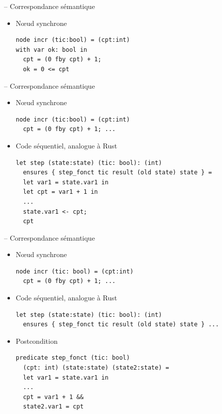\documentclass[11pt,usenames,dvipsnames]{beamer}
\begin{document}
\begin{frame}[fragile]{-- Correspondance sémantique}
\begin{itemize}
\item Nœud synchrone
  \begin{lstlisting}[language=minils]
node incr (tic:bool) = (cpt:int)
with var ok: bool in
  cpt = (0 fby cpt) + 1;
  ok = 0 <= cpt\end{lstlisting}
  \end{itemize}
\end{frame}

\begin{frame}[fragile]{-- Correspondance sémantique}
\begin{itemize}
\item Nœud synchrone
  \begin{lstlisting}[language=minils]
node incr (tic:bool) = (cpt:int)
  cpt = (0 fby cpt) + 1; ...\end{lstlisting}
\item Code séquentiel, analogue à Rust
  \begin{lstlisting}[language=why3]
let step (state:state) (tic: bool): (int)
  ensures { step_fonct tic result (old state) state } =
  let var1 = state.var1 in
  let cpt = var1 + 1 in
  ...
  state.var1 <- cpt;
  cpt
  \end{lstlisting}
\end{itemize}
\end{frame}

\begin{frame}[fragile]{-- Correspondance sémantique}
\begin{itemize}
\item Nœud synchrone
  \begin{lstlisting}[language=minils]
node incr (tic: bool) = (cpt:int)
  cpt = (0 fby cpt) + 1; ...\end{lstlisting}
\item Code séquentiel, analogue à Rust
  \begin{lstlisting}[language=why3]
let step (state:state) (tic: bool): (int)
  ensures { step_fonct tic result (old state) state } ...\end{lstlisting}
\item Postcondition
  \begin{lstlisting}[language=why3]
predicate step_fonct (tic: bool)
  (cpt: int) (state:state) (state2:state) =
  let var1 = state.var1 in
  ...
  cpt = var1 + 1 &&
  state2.var1 = cpt\end{lstlisting}
\end{itemize}
\end{frame}
\end{document}
